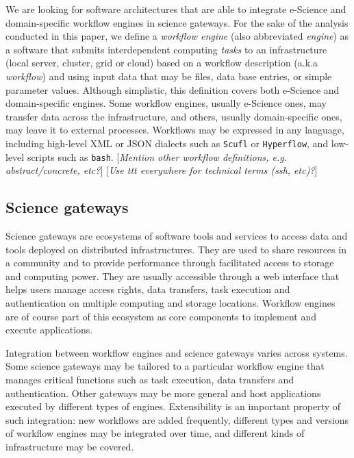 \documentclass[preprint,3p,twocolumn]{elsarticle}
\newcommand{\todo}[1]{\color{blue}\xspace[\emph{#1}]\xspace\color{black}}
\begin{document}
We are looking for software architectures that are able to integrate
e-Science and domain-specific workflow engines in science
gateways. For the sake of the analysis conducted in this paper, we
define a \emph{workflow engine} (also abbreviated \emph{engine}) as a
software that submits interdependent computing \emph{tasks} to an
infrastructure (local server, cluster, grid or cloud) based on a
workflow description (a.k.a \emph{workflow}) and using input data that
may be files, data base entries, or simple parameter values. Although
simplistic, this definition covers both e-Science and domain-specific
engines. Some workflow engines, usually e-Science ones, may transfer
data across the infrastructure, and others, usually domain-specific
ones, may leave it to external processes. Workflows may be expressed
in any language, including high-level XML or JSON dialects such as
\texttt{Scufl} or \texttt{Hyperflow}, and low-level scripts such as
\texttt{bash}.  \todo{Mention other workflow definitions,
  e.g. abstract/concrete, etc?} \todo{Use ttt everywhere for technical
  terms (ssh, etc)?}

\subsection{Science gateways}

Science gateways are ecosystems of software tools and services to
access data and tools deployed on distributed infrastructures. They
are used to share resources in a community and to provide performance
through facilitated access to storage and computing power. They are
usually accessible through a web interface that helps users manage
access rights, data transfers, task execution and authentication on
multiple computing and storage locations. Workflow engines are of
course part of this ecosystem as core components to implement and
execute applications.


Integration between workflow engines and science gateways varies
across systems. Some science gateways may be tailored to a particular
workflow engine that manages critical functions such as task
execution, data transfers and authentication. Other gateways may be
more general and host applications executed by different types of
engines. Extensibility is an important property of such integration:
new workflows are added frequently, different types and versions of
workflow engines may be integrated over time, and different kinds of
infrastructure may be covered.
\end{document}

